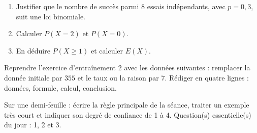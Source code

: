 \begin{exercice}[-- essentiel]
\begin{enumerate}\item Justifier que le nombre de succès parmi $8$ essais indépendants, avec $p=0{,}3$, suit une loi binomiale.\item Calculer $P(X=2)$ et $P(X=0)$.\item En déduire $P(X\geq1)$ et calculer $E(X)$.\end{enumerate}
\end{exercice}


\begin{dm}Reprendre l'exercice d'entraînement 2 avec les données suivantes : remplacer la donnée initiale par $355$ et le taux ou la raison par $7$. Rédiger en quatre lignes : données, formule, calcul, conclusion.\end{dm}

\begin{sortie}Sur une demi-feuille : écrire la règle principale de la séance, traiter un exemple très court et indiquer son degré de confiance de 1 à 4. Question(s) essentielle(s) du jour : 1, 2 et 3.\end{sortie}

